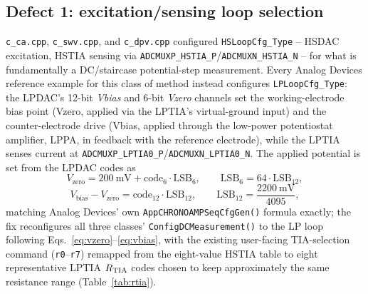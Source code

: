 \subsection{Defect 1: excitation/sensing loop selection}
\label{sec:rootcause}
\texttt{c\_ca.cpp}, \texttt{c\_swv.cpp}, and \texttt{c\_dpv.cpp} configured
\texttt{HSLoopCfg\_Type} -- HSDAC excitation, HSTIA sensing via
\texttt{ADCMUXP\_HSTIA\_P}/\texttt{ADCMUXN\_HSTIA\_N} -- for what is
fundamentally a DC/staircase potential-step measurement. Every Analog
Devices reference example for this class of method instead configures
\texttt{LPLoopCfg\_Type}: the LPDAC's 12-bit \emph{Vbias} and 6-bit
\emph{Vzero} channels set the working-electrode bias point (Vzero, applied
via the LPTIA's virtual-ground input) and the counter-electrode drive
(Vbias, applied through the low-power potentiostat amplifier, LPPA, in
feedback with the reference electrode), while the LPTIA senses current at
\texttt{ADCMUXP\_LPTIA0\_P}/\texttt{ADCMUXN\_LPTIA0\_N}. The applied
potential is set from the LPDAC codes as
\begin{equation}
V_{\mathrm{zero}} = \SI{200}{\milli\volt} + \mathrm{code}_{6}\cdot\mathrm{LSB}_{6},
\qquad \mathrm{LSB}_{6} = 64\cdot\mathrm{LSB}_{12},
\label{eq:vzero}
\end{equation}
\begin{equation}
V_{\mathrm{bias}} - V_{\mathrm{zero}} = \mathrm{code}_{12}\cdot\mathrm{LSB}_{12},
\qquad \mathrm{LSB}_{12} = \frac{\SI{2200}{\milli\volt}}{4095},
\label{eq:vbias}
\end{equation}
matching Analog Devices' own \texttt{AppCHRONOAMPSeqCfgGen()} formula
exactly; the fix reconfigures all three classes' \texttt{ConfigDCMeasurement()}
to the LP loop following Eqs.~\eqref{eq:vzero}--\eqref{eq:vbias}, with the
existing user-facing TIA-selection command (\texttt{r0}--\texttt{r7})
remapped from the eight-value HSTIA table to eight representative LPTIA
$R_{\mathrm{TIA}}$ codes chosen to keep approximately the same resistance range
(Table~\ref{tab:rtia}).

